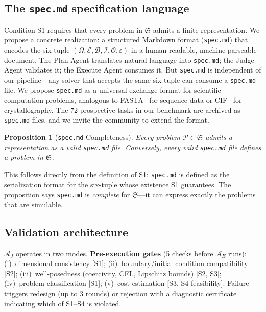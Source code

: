 \documentclass[11pt,a4paper]{article}
\newtheorem{proposition}[definition]{Proposition}
\newcommand{\Sclass}{\mathfrak{S}}
\newcommand{\Agent}{\mathcal{A}}
\newcommand{\Domain}{\Omega}
\begin{document}
\subsection{The \texttt{spec.md} specification language}

Condition S1 requires that every problem in $\Sclass$ admits a finite representation. We propose a concrete realization: a structured Markdown format (\texttt{spec.md}) that encodes the six-tuple $(\Domain, \mathcal{E}, \mathcal{B}, \mathcal{I}, \mathcal{O}, \varepsilon)$ in a human-readable, machine-parseable document. The Plan Agent translates natural language into \texttt{spec.md}; the Judge Agent validates it; the Execute Agent consumes it. But \texttt{spec.md} is independent of our pipeline---any solver that accepts the same six-tuple can consume a \texttt{spec.md} file. We propose \texttt{spec.md} as a universal exchange format for scientific computation problems, analogous to FASTA~\cite{pearson1988} for sequence data or CIF~\cite{hall1991} for crystallography. The 72 prospective tasks in our benchmark are archived as \texttt{spec.md} files, and we invite the community to extend the format.

\begin{proposition}[\texttt{spec.md} Completeness]
\label{prop:specmd}
Every problem $\mathcal{P} \in \Sclass$ admits a representation as a valid \texttt{spec.md} file. Conversely, every valid \texttt{spec.md} file defines a problem in $\Sclass$.
\end{proposition}

This follows directly from the definition of S1: \texttt{spec.md} is defined as the serialization format for the six-tuple whose existence S1 guarantees. The proposition says \texttt{spec.md} is \emph{complete} for $\Sclass$---it can express exactly the problems that are simulable.

\subsection{Validation architecture}

$\Agent_J$ operates in two modes. \textbf{Pre-execution gates} (5 checks before $\Agent_E$ runs): (i)~dimensional consistency [S1]; (ii)~boundary/initial condition compatibility [S2]; (iii)~well-posedness (coercivity, CFL, Lipschitz bounds) [S2, S3]; (iv)~problem classification [S1]; (v)~cost estimation [S3, S4 feasibility]. Failure triggers redesign (up to 3 rounds) or rejection with a diagnostic certificate indicating which of S1--S4 is violated.
\end{document}
